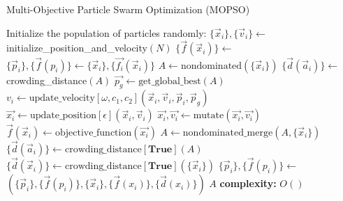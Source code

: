 \begin{algorithm}[H]
\caption{Multi-Objective Particle Swarm Optimization (MOPSO)}
\label{alg:mopso}
\begin{algorithmic}[1]
\State Initialize the population of particles randomly:
\State $\{\vec{x}_i\}, \{\vec{v}_i\} \gets$ initialize\_position\_and\_velocity$(N)$
\State $\{\vec{f}(\vec{x}_i)\} \gets$ 
\State $\{\vec{p}_i\}, \{\vec{f}(p_i)\}  \gets \{\vec{x}_i\}, \{\vec{f_{i}}(\vec{x}_i)\} $ 
\State $A \gets \text{nondominated}(\{\vec{x}_i\})$ 
\State $\{ \vec{d}(\vec{a}_i)\} \gets$ crowding\_distance$(A)$ 
\State $\vec{p_g} \gets \text{get\_global\_best}(A)$ 
\State $v_i \gets \text{update\_velocity}[\omega,c_1, c_2](\vec{x}_i,\vec{v}_i,\vec{p}_i,\vec{p}_g)$
\State $\vec{x_i} \gets \text{update\_position}[\epsilon](\vec{x}_i,\vec{v}_i)$
\State $\vec{x_i}, \vec{v_i} \gets \text{mutate}(\vec{x_i}, \vec{v_i})$ 
\EndIf
\State $\vec{f}(\vec{x}_i) \gets \text{objective\_function}(\vec{x_i})$ 
\EndFor 
\State $A \gets \text{nondominated\_merge}(A, \{\vec{x}_i\})$ 
\State $\{ \vec{d}(\vec{a}_i)\} \gets\text{crowding\_distance}[\textbf{True}](A)$
\State $\{ \vec{d}(\vec{x}_i)\} \gets\text{crowding\_distance}[\textbf{True}](\{\vec{x}_i\})$
\State $\{\vec{p}_i\}, \{\vec{f}(p_i)\} \gets$ $(\{\vec{p}_i\}, \{\vec{f}(p_i)\},\{\vec{x}_i\}, \{\vec{f}(x_i)\}, \{\vec{d}(x_i)\})$
\EndFor
\State \Return $A$
\State \textbf{complexity: } $O()$
\end{algorithmic}
\end{algorithm}

